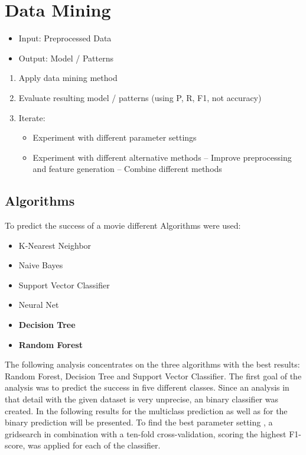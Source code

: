 \chapter{Data Mining}
\label{cha:data_mining}
\begin{itemize}
	\item Input: Preprocessed Data
	\item Output: Model / Patterns
\end{itemize}

\begin{enumerate}
	\item Apply data mining method
	\item Evaluate resulting model / patterns (using P, R, F1, not accuracy)
	\item Iterate:
	\begin{itemize}
		\item Experiment with different parameter settings
		\item Experiment with different alternative methods – Improve preprocessing and feature generation – Combine different methods
	\end{itemize}
\end{enumerate}

\section{Algorithms}
To predict the success of a movie different Algorithms were used:
\begin{itemize}
	\item K-Nearest Neighbor
	\item Naive Bayes
	\item Support Vector Classifier
	\item Neural Net
	\item \textbf{Decision Tree}
	\item \textbf{Random Forest}
\end{itemize}
The following analysis concentrates on the three algorithms with the best results: Random Forest, Decision Tree and Support Vector Classifier.
The first goal of the analysis was to predict the success in five different classes. Since an analysis in that detail with the given dataset is very unprecise, an binary classifier was created. In the following results for the multiclass prediction as well as for the binary prediction will be presented. To find the best parameter setting , a gridsearch in combination with a ten-fold cross-validation, scoring the highest F1-score, was applied for each of the classifier.

